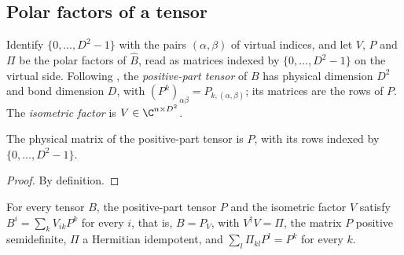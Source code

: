 \subsection{Polar factors of a tensor}

\begin{definition}
    \label{def:ldpolar_tensor}
    \leanok
    Identify $\{0,\dots,D^2-1\}$ with the pairs $(\alpha,\beta)$ of virtual
    indices, and let $V$, $P$ and $\Pi$ be the polar factors of
    $\widehat B$, read as matrices indexed by $\{0,\dots,D^2-1\}$ on the
    virtual side. Following \cite[eqs.~(9) and~(18)]{Malz2024Preparation}, the
    \emph{positive-part tensor} of $B$ has physical
    dimension $D^2$ and bond dimension $D$, with
    $(P^k)_{\alpha\beta}=P_{k,(\alpha,\beta)}$; its matrices are the rows of
    $P$. The \emph{isometric factor} is $V\in\C^{n\times D^2}$.
\end{definition}

\begin{lemma}
    \label{lem:ldpolar_pos_tensor_matrix}
    \leanok
    The physical matrix of the positive-part tensor is $P$, with its rows
    indexed by $\{0,\dots,D^2-1\}$.
\end{lemma}
\begin{proof}
    \leanok
    By definition.
\end{proof}

\begin{lemma}
    \label{thm:ldpolar_tensor_decomposition}
    \leanok
    For every tensor $B$, the positive-part tensor $P$ and the isometric
    factor $V$ satisfy $B^i=\sum_kV_{ik}P^k$ for every $i$, that is,
    $B=P_V$, with $V^\dagger V=\Pi$, the matrix $P$ positive
    semidefinite, $\Pi$ a Hermitian idempotent, and
    $\sum_l\Pi_{kl}P^l=P^k$ for every $k$.
\end{lemma}


